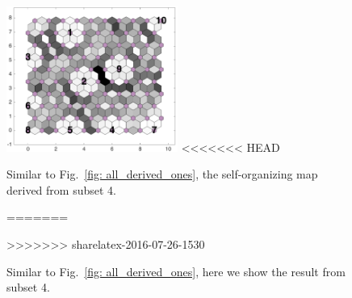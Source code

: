 \begin{figure}
        \centering
         \includegraphics[width=0.5\textwidth]{../../images0.01/M31/2D/image_subsets/subset2_dist_with_hits_t.png}
<<<<<<< HEAD
    \caption{Similar to Fig.~\ref{fig: all_derived_ones}, the self-organizing map derived from subset 4.}
=======
    \caption{Similar to Fig.~\ref{fig: all_derived_ones}, here we show the result from subset 4.}
>>>>>>> sharelatex-2016-07-26-1530
    \label{fig: subset2}
\end{figure}
